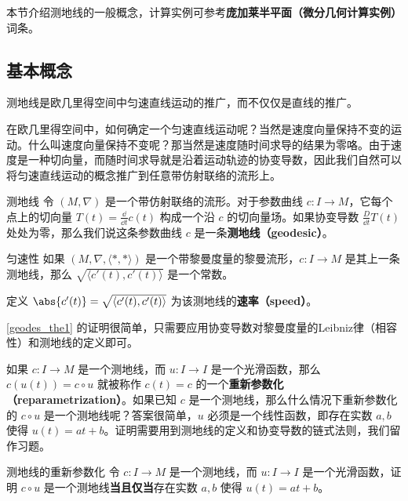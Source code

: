 

本节介绍测地线的一般概念，计算实例可参考\textbf{庞加莱半平面（微分几何计算实例）}词条。

\subsection{基本概念}

测地线是欧几里得空间中匀速直线运动的推广，而不仅仅是直线的推广。

在欧几里得空间中，如何确定一个匀速直线运动呢？当然是速度向量保持不变的运动。什么叫速度向量保持不变呢？那当然是速度随时间求导的结果为零咯。由于速度是一种切向量，而随时间求导就是沿着运动轨迹的协变导数，因此我们自然可以将匀速直线运动的概念推广到任意带仿射联络的流形上。

\begin{definition}{测地线}
令 $(M, \nabla)$ 是一个带仿射联络的流形。对于参数曲线 $c:I\to M$，它每个点上的切向量 $T(t)=\frac{\dd}{\dd t}c(t)$ 构成一个沿 $c$ 的切向量场。如果协变导数 $\frac{D}{\dd t}T(t)$ 处处为零，那么我们说这条参数曲线 $c$ 是一条\textbf{测地线（geodesic）}。
\end{definition}

\begin{theorem}{匀速性}\label{geodes_the1}
如果 $(M, \nabla,  \langle *, * \rangle )$ 是一个带黎曼度量的黎曼流形，$c:I\to M$ 是其上一条测地线，那么 $\sqrt{ \langle c'(t), c'(t) \rangle }$ 是一个常数。

定义 $\abs{c'(t)}=\sqrt{ \langle c'(t), c'(t) \rangle }$ 为该测地线的\textbf{速率（speed）}。
\end{theorem}

\autoref{geodes_the1} 的证明很简单，只需要应用协变导数对黎曼度量的Leibniz律（相容性）和测地线的定义即可。



如果 $c:I\to M$ 是一个测地线，而 $u:I\to I$ 是一个光滑函数，那么 $c(u(t))=c\circ u$ 就被称作 $c(t)=c$ 的一个\textbf{重新参数化（reparametrization）}。如果已知 $c$ 是一个测地线，那么什么情况下重新参数化的 $c\circ u$ 是一个测地线呢？答案很简单，$u$ 必须是一个线性函数，即存在实数 $a, b$ 使得 $u(t)=at+b$。证明需要用到测地线的定义和协变导数的链式法则，我们留作习题。

\begin{exercise}{测地线的重新参数化}
令 $c:I\to M$ 是一个测地线，而 $u:I\to I$ 是一个光滑函数，证明 $c\circ u$ 是一个测地线\textbf{当且仅当}存在实数 $a, b$ 使得 $u(t)=at+b$。
\end{exercise}

